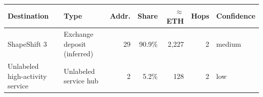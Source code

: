 \begin{tabular}{p{3.8cm} p{3.3cm} r r r r p{1.8cm}}\toprule
\textbf{Destination} & \textbf{Type} & \textbf{Addr.} & \textbf{Share} & \textbf{$\approx$ ETH} & \textbf{Hops} & \textbf{Confidence}\\\midrule
ShapeShift 3 & Exchange deposit (inferred) & 29 & 90.9\% & 2,227 & 2 & medium\\
Unlabeled high-activity service & Unlabeled service hub & 2 & 5.2\% & 128 & 2 & low\\
\bottomrule\end{tabular}

